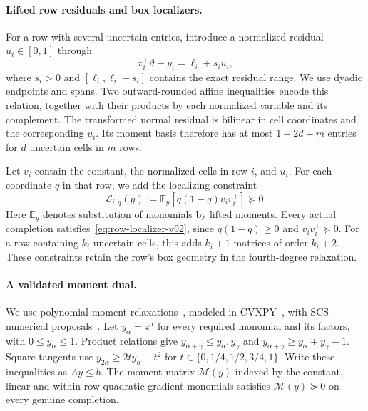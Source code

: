 \paragraph{Lifted row residuals and box localizers.}
For a row with several uncertain entries, introduce a normalized residual $u_i\in[0,1]$ through
\[
 x_i^\top\vartheta-y_i=\ell_i+s_i u_i,
\]
where $s_i>0$ and $[\ell_i,\ell_i+s_i]$ contains the exact residual range. We use dyadic endpoints and spans. Two outward-rounded affine inequalities encode this relation, together with their products by each normalized variable and its complement. The transformed normal residual is bilinear in cell coordinates and the corresponding $u_i$. Its moment basis therefore has at most $1+2d+m$ entries for $d$ uncertain cells in $m$ rows.

Let $v_i$ contain the constant, the normalized cells in row $i$, and $u_i$. For each coordinate $q$ in that row, we add the localizing constraint
\begin{equation}
 \mathcal L_{i,q}(y)
 :=\mathbb E_y\!\left[q(1-q)v_i v_i^\top\right]\succeq0.
 \label{eq:row-localizer-v92}
\end{equation}
Here $\mathbb E_y$ denotes substitution of monomials by lifted moments. Every actual completion satisfies~\eqref{eq:row-localizer-v92}, since $q(1-q)\ge0$ and $v_i v_i^\top\succeq0$. For a row containing $k_i$ uncertain cells, this adds $k_i+1$ matrices of order $k_i+2$. These constraints retain the row's box geometry in the fourth-degree relaxation.

\paragraph{A validated moment dual.}
We use polynomial moment relaxations~\citep{lasserre2001}, modeled in CVXPY~\citep{diamond2016cvxpy}, with SCS numerical proposals~\citep{odonoghue2016scs}.
Let $y_\alpha=z^\alpha$ for every required monomial and its factors, with $0\le y_\alpha\le1$. Product relations give $y_{\alpha+\gamma}\le y_\alpha,y_\gamma$ and $y_{\alpha+\gamma}\ge y_\alpha+y_\gamma-1$. Square tangents use $y_{2\alpha}\ge2t y_\alpha-t^2$ for $t\in\{0,1/4,1/2,3/4,1\}$. Write these inequalities as $Ay\le b$. The moment matrix $\mathcal M(y)$ indexed by the constant, linear and within-row quadratic gradient monomials satisfies $\mathcal M(y)\succeq0$ on every genuine completion.

